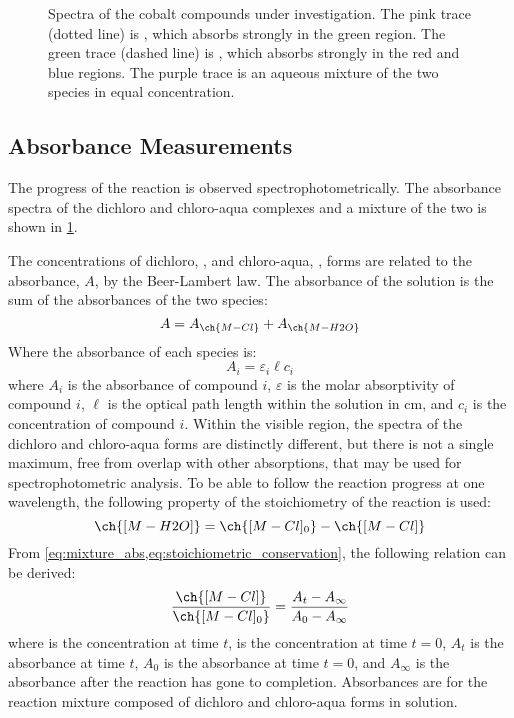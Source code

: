 \begin{figure}[htb]
	
	\caption{Spectra of the cobalt compounds under investigation. 
	The pink trace (dotted line) is , which absorbs strongly in the green region. 
	The green trace (dashed line) is , which absorbs strongly in the red and blue regions. 
	The purple trace is an aqueous mixture of the two species in equal concentration.}
	\label{fig:co_spectra}
\end{figure}	

\subsection{Absorbance Measurements}
\label{subs:absorbance_measurements}

The progress of the reaction is observed spectrophotometrically. 
The absorbance spectra of the dichloro and chloro-aqua complexes and a mixture of the two is shown in \cref{fig:co_spectra}. 

The concentrations of dichloro, \ch{[M-Cl]}, and chloro-aqua, \ch{[M-H2O]}, forms are related to the absorbance, \(A\), by the Beer-Lambert law. 
The absorbance of the solution is the sum of the absorbances of the two species: 
\begin{equation}
	A = A_{\ch{M-Cl}} + A_{\ch{M-H2O}}
	\label{eq:mixture_abs}
\end{equation}
Where the absorbance of each species is:
\begin{equation}
	A_{i} = \varepsilon_{i} \ell c_{i}
	\label{eq:beer-lambert_law}
\end{equation}
where \(A_{i}\) is the absorbance of compound \(i\), \(\varepsilon\) is the molar absorptivity of compound \(i\), \(\ell\) is the optical path length within the solution in \unit{\cm},  and \(c_{i}\) is the concentration of compound \(i\). 
Within the visible region, the spectra of the dichloro and chloro-aqua forms are distinctly different, but there is not a single maximum, free from overlap with other absorptions, that may be used for spectrophotometric analysis. 
To be able to follow the reaction progress at one wavelength, the following property of the stoichiometry of the reaction is used:
\begin{equation}
	\ch{[M-H2O]} = \ch{[M-Cl]_0} - \ch{[M-Cl]}
	\label{eq:stoichiometric_conservation}
\end{equation}
From \cref{eq:mixture_abs,eq:stoichiometric_conservation}, the following relation can be derived:
\begin{equation}
	\frac{\ch{[M-Cl]}}{\ch{[M-Cl]_0}} = \frac{A_t - A_\infty}{A_0 - A_\infty}
	\label{eq:conversion_fraction}
\end{equation}
where \ch{[M-Cl]} is the concentration at time \(t\),  is the concentration at time \(t=0\), \(A_t\) is the absorbance at time \(t\), \(A_0\) is the absorbance at time \(t=0\), and \(A_\infty\) is the absorbance after the reaction has gone to completion. 
Absorbances are for the reaction mixture composed of dichloro and chloro-aqua forms in solution. 

